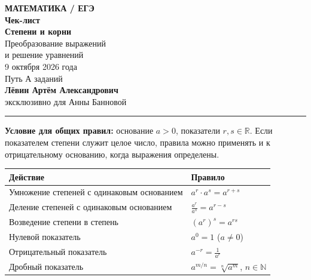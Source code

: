 \documentclass[a4paper,12pt]{article}
\newcommand{\topic}[1]{\Needspace{5\baselineskip}\vspace{5mm}{\Large\bfseries\color{darkaccent}#1}\par\vspace{1mm}\textcolor{pale}{\rule{\linewidth}{0.7pt}}\vspace{1mm}}
\newcommand{\important}[1]{\textbf{\color{darkaccent}#1}}
\begin{document}
\thispagestyle{empty}
\begin{center}
\vspace*{37mm}
{\large\color{accent}\textbf{МАТЕМАТИКА \enspace / \enspace ЕГЭ}}\\[24mm]
{\Huge\bfseries\color{darkaccent}Чек-лист}\\[8mm]
{\LARGE\bfseries Степени и корни}\\[3mm]
{\Large Преобразование выражений\\и решение уравнений}\\[28mm]
{\normalsize\color{textgray}9 октября 2026 года}\\[8mm]
{\small Путь А \enspace\textcolor{accent}{\textbullet} заданий}\\[34mm]
{\normalsize\bfseries Лёвин Артём Александрович}\\[3mm]
{\normalsize эксклюзивно для Анны Банновой}
\end{center}
\clearpage

\topic{1. Свойства степеней}
\important{Условие для общих правил:} основание $a>0$, показатели $r,s\in\mathbb R$. Если показателем степени служит целое число, правила можно применять и к отрицательному основанию, когда выражения определены.

\renewcommand{\arraystretch}{1.25}
\begin{center}
\begin{tabularx}{\linewidth}{@{}X>{\raggedright\arraybackslash}p{68mm}@{}}
\toprule
\textbf{Действие} & \textbf{Правило} \\
\midrule
Умножение степеней с одинаковым основанием & $a^r\cdot a^s=a^{r+s}$ \\
Деление степеней с одинаковым основанием & $\displaystyle\frac{a^r}{a^s}=a^{r-s}$ \\
Возведение степени в степень & $(a^r)^s=a^{rs}$ \\
Нулевой показатель & $a^0=1$ ($a\neq0$) \\
Отрицательный показатель & $\displaystyle a^{-r}=\frac1{a^r}$ \\
Дробный показатель & $\displaystyle a^{m/n}=\sqrt[n]{a^m}$, $n\in\mathbb N$ \\
\bottomrule
\end{tabularx}
\end{center}
\end{document}

